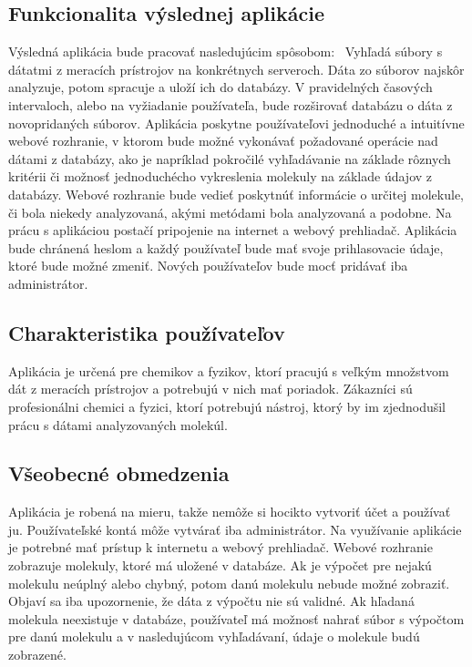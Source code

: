 \documentclass[12pt,a4paper]{article}
\begin{document}
\subsection{Funkcionalita výslednej aplikácie}
Výsledná aplikácia bude pracovať nasledujúcim spôsobom: \
Vyhľadá súbory s dátatmi z meracích prístrojov na konkrétnych serveroch. Dáta zo súborov najskôr analyzuje, potom spracuje a uloží ich do databázy.
V pravidelných časových intervaloch, alebo na vyžiadanie používateľa, bude rozširovať databázu o dáta z novopridaných súborov. Aplikácia poskytne používateľovi jednoduché a intuitívne webové rozhranie, v ktorom bude možné vykonávať požadované operácie nad dátami z databázy, ako je napríklad pokročilé vyhľadávanie na základe rôznych kritérii či možnosť jednoduchécho vykreslenia molekuly na základe údajov z databázy. Webové rozhranie bude vedieť poskytnúť informácie o určitej molekule, či bola niekedy analyzovaná, akými metódami bola analyzovaná a podobne. Na prácu s aplikáciou postačí pripojenie na internet a webový prehliadač. Aplikácia bude chránená heslom a každý používateľ bude mať svoje prihlasovacie údaje, ktoré bude možné zmeniť. Nových používateľov bude mocť pridávať iba administrátor.

\subsection{Charakteristika používateľov}
Aplikácia je určená pre chemikov a fyzikov, ktorí pracujú s veľkým množstvom dát z meracích prístrojov a potrebujú v nich mať poriadok. Zákazníci sú profesionálni chemici a fyzici, ktorí potrebujú nástroj, ktorý by im zjednodušil prácu s dátami analyzovaných molekúl.

\subsection{Všeobecné obmedzenia}
Aplikácia je robená na mieru, takže nemôže si hocikto vytvoriť účet a používať ju. Používateľské kontá môže vytvárať iba administrátor. Na využívanie aplikácie je potrebné mať prístup k internetu a webový prehliadač. Webové rozhranie zobrazuje molekuly, ktoré má uložené v databáze. Ak je výpočet pre nejakú molekulu neúplný alebo chybný, potom danú molekulu nebude možné zobraziť. Objaví sa iba upozornenie, že dáta z výpočtu nie sú validné. Ak hľadaná molekula neexistuje v databáze, používateľ má možnosť nahrať súbor s výpočtom pre danú molekulu a v nasledujúcom vyhľadávaní, údaje o molekule budú zobrazené.
\end{document}
